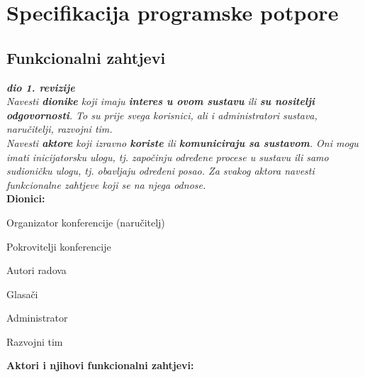 \chapter{Specifikacija programske potpore}
		
	\section{Funkcionalni zahtjevi}
			
			\textbf{\textit{dio 1. revizije}}\\
			
			\textit{Navesti \textbf{dionike} koji imaju \textbf{interes u ovom sustavu} ili  \textbf{su nositelji odgovornosti}. To su prije svega korisnici, ali i administratori sustava, naručitelji, razvojni tim.}\\
				
			\textit{Navesti \textbf{aktore} koji izravno \textbf{koriste} ili \textbf{komuniciraju sa sustavom}. Oni mogu imati inicijatorsku ulogu, tj. započinju određene procese u sustavu ili samo sudioničku ulogu, tj. obavljaju određeni posao. Za svakog aktora navesti funkcionalne zahtjeve koji se na njega odnose.}\\
			
			
			\noindent \textbf{Dionici:}
			
			\begin{packed_enum}
				
				\item Organizator konferencije (naručitelj)
				\item Pokrovitelji konferencije
				\item Autori radova
				\item Glasači
				\item Administrator
				\item Razvojni tim
				
			\end{packed_enum}
			
			\noindent \textbf{Aktori i njihovi funkcionalni zahtjevi:}
			
